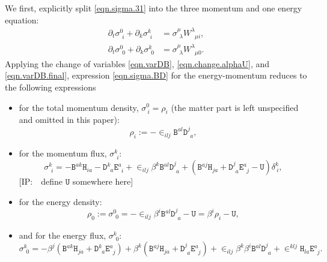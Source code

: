 \documentclass[
10pt, %
a4paper, %
oneside, %
headinclude,footinclude, %
BCOR5mm, %
]{scrartcl}
\newcommand{\IP}[1]{{\color{Red}[IP:\ \ #1]}}
\newcommand{\pd}[1]{\partial_{#1}}
\newcommand{\Dfin}[2]{\mathtt{D}_{\phantom{#2}#1}^{#2}}	%
\newcommand{\Hfin}[2]{\mathtt{H}_{#2#1}}	%
\newcommand{\Efin}[2]{\mathtt{E}^{#1}_{\phantom{#1}#2}}	%
\newcommand{\Ufin}{\mathtt{U}}
\newcommand{\Bfin}[2]{\mathtt{B}^{#1#2}}	%
\newcommand{\w}[2]{W^{#1}_{\phantom{#1}#2}}
\newcommand{\EMmat}[2]{\sigma^{#1}_{\ \,#2}}
\newcommand{\LCsymb}{\bm{\in}}    %
\newcommand{\KD}[2]{\delta^{#1}_{\ #2}}
\begin{document}
We first, explicitly split \eqref{eqn.sigma.31} into the three momentum and one energy equation:
\begin{subequations}\label{eqn.EM.sigma}
	\begin{align}
		\pd{t}\EMmat{0}{i} + \pd{k}\EMmat{k}{i}
		& = \EMmat{\mu}{\lambda} 
		\w{\lambda}{\mu i},\\[2mm]
		\pd{t}\EMmat{0}{0} + \pd{k}\EMmat{k}{0}
		& = \EMmat{\mu}{\lambda} 
		\w{\lambda}{\mu 0}.
	\end{align}
\end{subequations}
Applying the change of variables \eqref{eqn.varDB}, \eqref{eqn.change.alphaU}, and 
\eqref{eqn.varDB.final}, expression \eqref{eqn.sigma.BD} for the energy-momentum reduces to the 
following expressions
\begin{itemize}
	\item 
	for the total momentum density, $ \sigma^0_{\ i} = \rho_i $ (the matter part is left 
	unspecified and omitted in this paper):
	\begin{equation}\label{eqn.sigma0i}
		\rho_i :=-\LCsymb_{ilj} \Bfin{a}{l}\Dfin{a}{j},
	\end{equation}
	\item
	for the momentum flux, $ \EMmat{k}{i}$:
	\begin{equation}\label{eqn.sigmaki}
		\EMmat{k}{i} = -\Bfin{a}{k} \Hfin{a}{i} - \Dfin{a}{k} \Efin{a}{i} + 
		\LCsymb_{ilj} 
		\beta^k \Bfin{a}{l}\Dfin{a}{j} + (\Bfin{a}{j} \Hfin{a}{j} + \Dfin{a}{j} \Efin{a}{j} 
		- \Ufin)\KD{k}{i},
	\end{equation}
	\IP{define $ \Ufin $ somewhere here}
	\item
	for the energy density:
	\begin{equation}\label{eqn.sigma00}
		\rho_0 :=\EMmat{0}{0} = - \LCsymb_{ilj} 
		\beta^i\Bfin{a}{l}\Dfin{a}{j} - \Ufin = \beta^i 
		\rho_i 
		- \Ufin,
	\end{equation}
	\item
	and for the energy flux, $ \EMmat{k}{0} $:
	\begin{equation}\label{eqn.sigmak0}
		{\EMmat{k}{0}} = -\beta^j( \Bfin{a}{k} \Hfin{a}{j} + \Dfin{a}{k} \Efin{a}{j})
		+
		\beta^k( \Bfin{a}{j} \Hfin{a}{j} + \Dfin{a}{j} \Efin{a}{j})
		+
		\LCsymb_{ilj}\beta^k\beta^i\Bfin{a}{l}\Dfin{a}{j}
		+
		\LCsymb^{klj} \Hfin{a}{l} \Efin{a}{j}.
	\end{equation}
\end{itemize}
\end{document}
